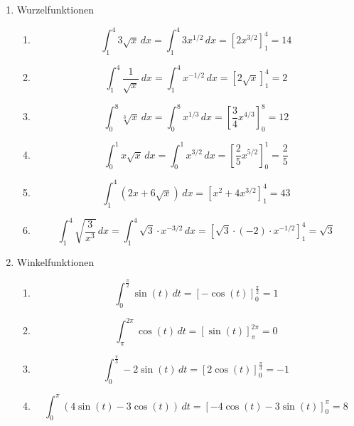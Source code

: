 \begin{enumerate}
	\item Wurzelfunktionen
	      \begin{enumerate}
		      \item
		            \[
			            \int_1^4 3\sqrt{x}\,dx
			            =  \int_1^4 3 x^{1/2}\,dx
			            = \left[2x^{3/2}\right]_1^4
			            = 14
		            \]
		      \item
		            \[
			            \int_1^4 \frac{1}{\sqrt{x}}\,dx
			            = \int_1^4 x^{-1/2}\,dx
			            = \left[2\sqrt{x}\right]_1^4
			            = 2
		            \]
		      \item
		            \[
			            \int_0^8 \sqrt[3]{x}\,dx
			            = \int_0^8 x^{1/3}\,dx
			            = \left[\frac{3}{4}x^{4/3}\right]_0^8
			            = 12
		            \]
		      \item
		            \[
			            \int_0^1 x\sqrt{x}\,dx
			            = \int_0^1 x^{3/2}\,dx
			            = \left[\frac{2}{5}x^{5/2}\right]_0^1
			            = \frac{2}{5}
		            \]
		      \item
		            \[
			            \int_1^4 (2x+6\sqrt{x})\,dx
			            = \left[x^2+4x^{3/2}\right]_1^4
			            = 43
		            \]
		      \item
		            \[
			            \int_1^4 \sqrt{\frac{3}{x^3}}\,dx
			            = \int_1^4 \sqrt{3}\cdot x^{-3/2}\,dx
			            = \left[\sqrt{3}\cdot (-2)\cdot x^{-1/2}\right]_1^4
			            = \sqrt{3}
		            \]
	      \end{enumerate}

	\item Winkelfunktionen
	      \begin{enumerate}
		      \item
		            \[
			            \int_0^{\frac{\pi}{2}} \sin(t)\,dt
			            = \left[-\cos(t)\right]_0^{\frac{\pi}{2}}
			            = 1
		            \]
		      \item
		            \[
			            \int_\pi^{2\pi} \cos(t)\,dt
			            = \left[\sin(t)\right]_\pi^{2\pi}
			            = 0
		            \]
		      \item
		            \[
			            \int_0^{\frac{\pi}{3}} -2\sin(t)\,dt
			            = \left[2\cos(t)\right]_0^{\frac{\pi}{3}}
			            = -1
		            \]
		      \item
		            \[
			            \int_0^{\pi} (4\sin(t)-3\cos(t))\,dt
			            = \left[-4\cos(t)-3\sin(t)\right]_0^{\pi}
			            = 8
		            \]
	      \end{enumerate}


\end{enumerate}

